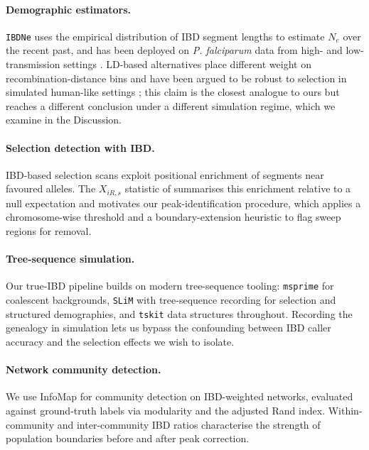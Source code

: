 \documentclass[11pt]{article}
\begin{document}
\paragraph{Demographic estimators.} \texttt{IBDNe} \citep{browning2015ibdne} uses the empirical distribution of IBD segment lengths to estimate $N_e$ over the recent past, and has been deployed on \textit{P. falciparum} data from high- and low-transmission settings \citep{daniels2015modeling,wong2017genetic}. LD-based alternatives place different weight on recombination-distance bins and have been argued to be robust to selection in simulated human-like settings \citep{novo2022ld}; this claim is the closest analogue to ours but reaches a different conclusion under a different simulation regime, which we examine in the Discussion.

\paragraph{Selection detection with IBD.} IBD-based selection scans exploit positional enrichment of segments near favoured alleles. The $X_{iR,s}$ statistic of \citet{henden2018xirs} summarises this enrichment relative to a null expectation and motivates our peak-identification procedure, which applies a chromosome-wise threshold and a boundary-extension heuristic to flag sweep regions for removal.

\paragraph{Tree-sequence simulation.} Our true-IBD pipeline builds on modern tree-sequence tooling: \texttt{msprime} \citep{kelleher2016msprime,baumdicker2022msprime} for coalescent backgrounds, \texttt{SLiM} \citep{haller2019slim} with tree-sequence recording \citep{haller2019treeseq,kelleher2018efficient} for selection and structured demographies, and \texttt{tskit} data structures throughout. Recording the genealogy in simulation lets us bypass the confounding between IBD caller accuracy and the selection effects we wish to isolate.

\paragraph{Network community detection.} We use InfoMap \citep{rosvall2008maps} for community detection on IBD-weighted networks, evaluated against ground-truth labels via modularity \citep{newman2004modularity} and the adjusted Rand index. Within-community and inter-community IBD ratios characterise the strength of population boundaries before and after peak correction.
\end{document}
